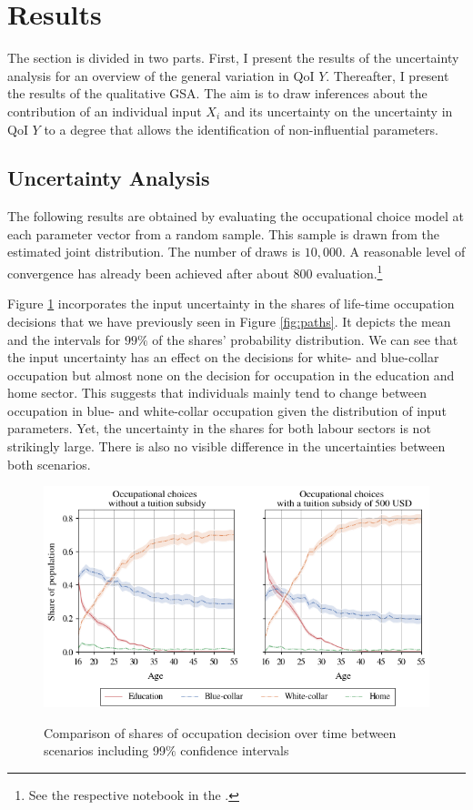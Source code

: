\documentclass[a4paper,12pt]{article}
\begin{document}
\newpage %

\section{Results}

The section is divided in two parts. First, I present the results of the uncertainty analysis for an overview of the general variation in QoI $Y$. Thereafter, I present the results of the qualitative GSA. The aim is to draw inferences about the contribution of an individual input $X_i$ and its uncertainty on the uncertainty in QoI $Y$ to a degree that allows the identification of non-influential parameters.

\subsection{Uncertainty Analysis}
The following results are obtained by evaluating the occupational choice model at each parameter vector from a random sample. This sample is drawn from the estimated joint distribution. The number of draws is $10,000$. A reasonable level of convergence has already been achieved after about 800 evaluation.\footnote{See the respective notebook in the .}


Figure \ref{fig:uq_paths} incorporates the input uncertainty in the shares of life-time occupation decisions that we have previously seen in Figure \ref{fig:paths}. It depicts the mean and the intervals for $99\%$ of the shares' probability distribution. We can see that the input uncertainty has an effect on the decisions for white- and blue-collar occupation but almost none on the decision for occupation in the education and home sector. This suggests that individuals mainly tend to change between occupation in blue- and white-collar occupation given the distribution of input parameters. Yet, the uncertainty in the shares for both labour sectors is not strikingly large. There is also no visible difference in the uncertainties between both scenarios.
\begin{figure}[H]
	\caption{Comparison of shares of occupation decision over time between scenarios including 99$\%$ confidence intervals}
	\centering
	\includegraphics[scale=0.75]{../../../scrypy/figures/cone_plot_choice_shares}
	\label{fig:uq_paths}
\end{figure}
\end{document}

